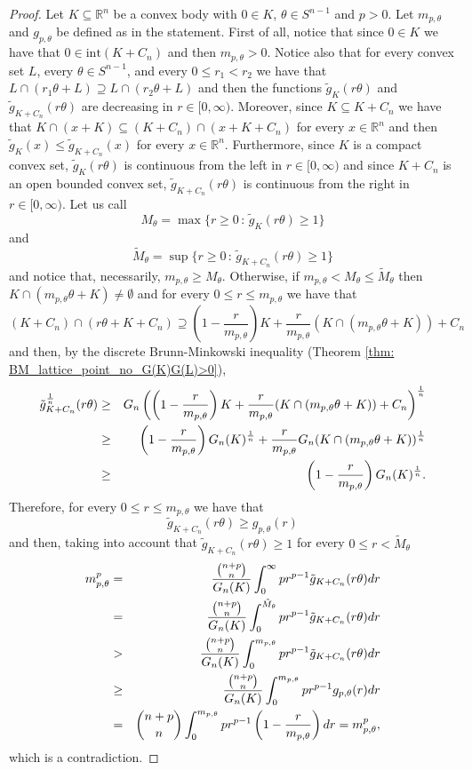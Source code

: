 \documentclass[10pt]{amsart}
\def\R{\mathbb{R}}
\numberwithin{equation}{section}
\begin{document}
\begin{proof}
Let $K\subseteq\R^n$ be a convex body with $0\in K$, $\theta\in S^{n-1}$ and $p>0$. Let $m_{p,\theta}$ and $g_{p,\theta}$ be defined as in the statement. First of all, notice that since $0\in K$ we have that $0\in\textrm{int}(K+C_n)$ and then $m_{p,\theta}>0$. Notice also that for every convex set $L$, every $\theta\in S^{n-1}$, and every $0\leq r_1<r_2$ we have that $L\cap(r_1\theta +L)\supseteq L\cap(r_2\theta+L)$ and then the functions $\tilde{g}_K(r\theta)$ and $\tilde{g}_{K+C_n}(r\theta)$ are decreasing in $r\in[0,\infty)$. Moreover, since $K\subseteq K+C_n$ we have that $K\cap(x+K)\subseteq (K+C_n)\cap(x+K+C_n)$ for every $x\in\R^n$ and then $\tilde{g}_K(x)\leq \tilde{g}_{K+C_n}(x)$ for every $x\in\R^n$. Furthermore, since $K$ is a compact convex set, $\tilde{g}_K(r\theta)$ is continuous from the left in $r\in[0,\infty)$ and since $K+C_n$ is an open bounded convex set, $\tilde{g}_{K+C_n}(r\theta)$ is continuous from the right in $r\in[0,\infty)$. Let us call
\begin{equation}\label{eq:DefinitionMtheta}
M_\theta=\max\{r\geq0\,:\, \tilde{g}_{K}(r\theta)\geq 1\}
\end{equation}
and
$$
\tilde{M}_\theta=\sup\{r\geq0\,:\, \tilde{g}_{K+C_n}(r\theta)\geq 1\}
$$
and notice that, necessarily, $m_{p,\theta}\geq M_\theta$. Otherwise, if $m_{p,\theta}<M_\theta\leq\tilde{M}_\theta$ then \\$K\cap(m_{p,\theta}\theta+K)\neq\emptyset$ and for every $0\leq r\leq m_{p,\theta}$ we have that
$$
(K+C_n)\cap\left(r\theta+K+C_n\right)\supseteq\left(1-\frac{r}{m_{p,\theta}}\right)K+\frac{r}{m_{p,\theta}}(K\cap(m_{p,\theta}\theta+K))+C_n
$$
and then, by the discrete Brunn-Minkowski inequality (Theorem \ref{thm: BM_lattice_point_no_G(K)G(L)>0}),
\begin{eqnarray*}
\tilde{g}_{K+C_n}^\frac{1}{n}(r\theta)&\geq & G_n\left(\left(1-\frac{r}{m_{p,\theta}}\right)K+\frac{r}{m_{p,\theta}}(K\cap(m_{p,\theta}\theta+K))+C_n\right)^\frac{1}{n}\cr &\geq&\left(1-\frac{r}{m_{p,\theta}}\right)G_n(K)^\frac{1}{n}+\frac{r}{m_{p,\theta}}G_n(K\cap(m_{p,\theta}\theta+K))^\frac{1}{n}\cr
&\geq&\left(1-\frac{r}{m_{p,\theta}}\right)G_n(K)^\frac{1}{n}.
\end{eqnarray*}
Therefore, for every $0\leq r\leq m_{p,\theta}$ we have that
$$
\tilde{g}_{K+C_n}(r\theta)\geq g_{p,\theta}(r)
$$
and then, taking into account that $\tilde{g}_{K+C_n}(r\theta)\geq 1$ for every $0\leq r<\tilde{M}_\theta$
\begin{eqnarray*}
m_{p,\theta}^p&=&\frac{{{n+p}\choose{n}}}{G_n(K)}\int_0^\infty pr^{p-1}\tilde{g}_{K+C_n}(r\theta)dr\cr
&=&\frac{{{n+p}\choose{n}}}{G_n(K)}\int_0^{\tilde{M}_\theta} pr^{p-1}\tilde{g}_{K+C_n}(r\theta)dr\cr
&>&\frac{{{n+p}\choose{n}}}{G_n(K)}\int_0^{m_{p,\theta}} pr^{p-1}\tilde{g}_{K+C_n}(r\theta)dr\cr
&\geq&\frac{{{n+p}\choose{n}}}{G_n(K)}\int_0^{m_{p,\theta}} pr^{p-1}g_{p,\theta}(r)dr\cr
&=&{{n+p}\choose{n}}\int_0^{m_{p,\theta}} pr^{p-1}\left(1-\frac{r}{m_{p,\theta}}\right)dr=m_{p,\theta}^p,\cr
\end{eqnarray*}
which is a contradiction.


\end{proof}
\end{document}
